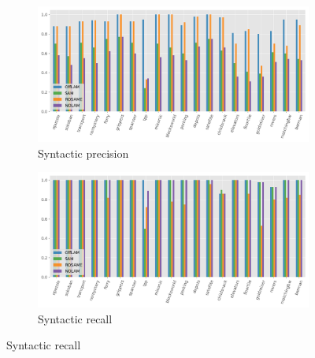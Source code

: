 
\begin{figure}[ht]
  \centering

  \begin{subfigure}[b]{0.45\textwidth}
    \includegraphics[width=\textwidth]{figures/10_traces/barplots/syn_precision.png}
    \caption{Syntactic precision}
    \label{fig:syn-precision}
  \end{subfigure}
  \begin{subfigure}[b]{0.45\textwidth}
    \includegraphics[width=\textwidth]{figures/10_traces/barplots/syn_recall.png}
    \caption{Syntactic recall}
  \end{subfigure}

  \vspace{1em}


\end{figure}
